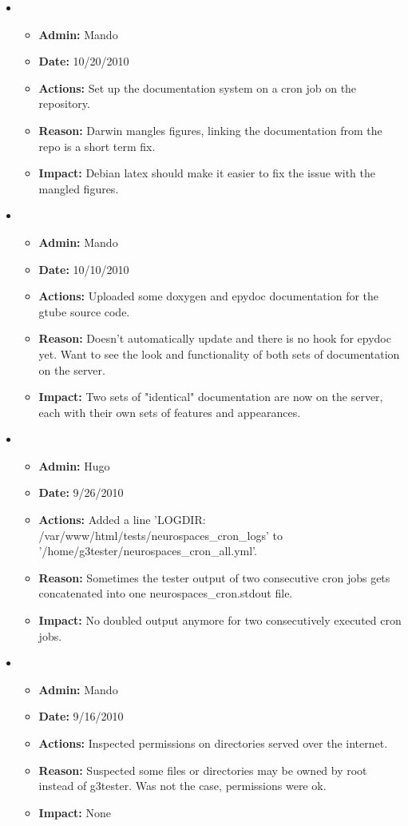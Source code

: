 \documentclass[12pt]{article}
\begin{document}
\begin{itemize}
	
\item
\begin{itemize}
\item[] {\bf Admin:} Mando
\item[] {\bf Date:} 10/20/2010 
\item[] {\bf Actions:} Set up the documentation system on a cron job on the repository. 
\item[] {\bf Reason:} Darwin mangles figures, linking the documentation from the repo is a short term fix.
\item[] {\bf Impact:} Debian latex should make it easier to fix the issue with the mangled figures.
\end{itemize}

\item
\begin{itemize}
\item[] {\bf Admin:} Mando
\item[] {\bf Date:} 10/10/2010 
\item[] {\bf Actions:} Uploaded some doxygen and epydoc documentation for the gtube source code. 
\item[] {\bf Reason:} Doesn't automatically update and there is no hook for epydoc yet. Want to see the look and functionality of both sets of documentation on the server.
\item[] {\bf Impact:} Two sets of "identical" documentation are now on the server, each with their own sets of features and appearances.
\end{itemize}
	
\item
\begin{itemize}
\item[] {\bf Admin:} Hugo
\item[] {\bf Date:} 9/26/2010 
\item[] {\bf Actions:} Added a line 'LOGDIR: /var/www/html/tests/neurospaces\_cron\_logs' to '/home/g3tester/neurospaces\_cron\_all.yml'.
\item[] {\bf Reason:} Sometimes the tester output of two consecutive
  cron jobs gets concatenated into one neurospaces\_cron.stdout file.
\item[] {\bf Impact:} No doubled output anymore for two consecutively executed cron jobs.
\end{itemize}

\item
\begin{itemize}
\item[] {\bf Admin:} Mando
\item[] {\bf Date:} 9/16/2010 
\item[] {\bf Actions:} Inspected permissions on directories served over the internet.
\item[] {\bf Reason:} Suspected some files or directories may be owned by root instead of g3tester. Was not the case, permissions were ok.
\item[] {\bf Impact:} None
\end{itemize}


\end{itemize}
\end{document}
